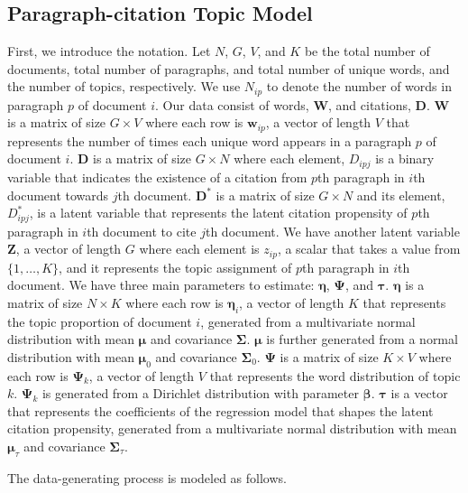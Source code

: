 \subsection{Paragraph-citation Topic Model}
First, we introduce the notation.
Let $N$, $G$, $V$, and $K$ be the total number of documents, total number of paragraphs, and total number of unique words, and the number of topics, respectively.
We use $N_{ip}$ to denote the number of words in paragraph $p$ of document $i$.
Our data consist of words, $\textbf{W}$, and citations, $\textbf{D}$.
$\textbf{W}$ is a matrix of size $G \times V$ where each row is $\textbf{w}_{ip}$, a vector of length $V$ that represents the number of times each unique word appears in a paragraph $p$ of document $i$.
$\textbf{D}$ is a matrix of size $G \times N$ where each element, $D_{ipj}$ is a binary variable that indicates the existence of a citation from $p$th paragraph in $i$th document towards $j$th document.
$\textbf{D}^*$ is a matrix of size $G \times N$ and its element, $D_{ipj}^*$, is a latent variable that represents the latent citation propensity of $p$th paragraph in $i$th document to cite $j$th document.
We have another latent variable $\textbf{Z}$, a vector of length $G$ where each element is $z_{ip}$, a scalar that takes a value from $\{1,\ldots, K\}$, and it represents the topic assignment of $p$th paragraph in $i$th document.
We have three main parameters to estimate: $\pmb\eta$, $\pmb\Psi$, and $\pmb\tau$.
$\pmb\eta$ is a matrix of size $N \times K$ where each row is $\pmb\eta_i$, a vector of length $K$ that represents the topic proportion of document $i$, generated from a multivariate normal distribution with mean $\pmb\mu$ and covariance $\pmb\Sigma$.
$\pmb\mu$ is further generated from a normal distribution with mean $\pmb\mu_0$ and covariance $\pmb\Sigma_0$.
$\pmb\Psi$ is a matrix of size $K \times V$ where each row is $\pmb\Psi_k$, a vector of length $V$ that represents the word distribution of topic $k$. 
$\pmb\Psi_k$ is generated from a Dirichlet distribution with parameter $\pmb\beta$.
$\pmb\tau$ is a vector that represents the coefficients of the regression model that shapes the latent citation propensity, generated from a multivariate normal distribution with mean $\pmb\mu_{\tau}$ and covariance $\pmb\Sigma_{\tau}$.

The data-generating process is modeled as follows.

